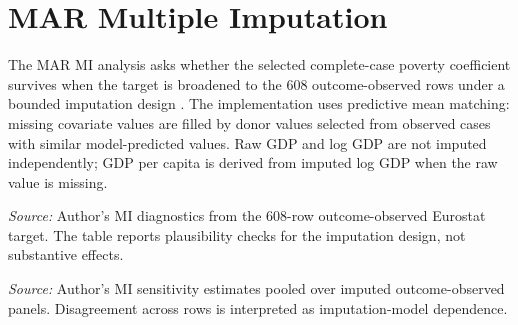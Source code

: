 \clearpage

\section{MAR Multiple Imputation}

The MAR MI analysis asks whether the selected complete-case poverty coefficient survives when the target is broadened to the 608 outcome-observed rows under a bounded imputation design \citep{rubin_1987,little_rubin_2019}. The implementation uses predictive mean matching: missing covariate values are filled by donor values selected from observed cases with similar model-predicted values. Raw GDP and log GDP are not imputed independently; GDP per capita is derived from imputed log GDP when the raw value is missing.

\begin{table}[htbp]
\centering
\scriptsize
\caption{Baseline PMM diagnostics for imputed covariates. Diagnostics refer to the 608-row outcome-observed target, the 30-imputation baseline PMM model, and bounded plausible ranges for imputed covariates.}
\label{tab:mi_diagnostics_summary}

\vspace{0.25em}

\begin{minipage}{0.96\textwidth}
\scriptsize \textit{Source:} Author's MI diagnostics from the 608-row outcome-observed Eurostat target. The table reports plausibility checks for the imputation design, not substantive effects.
\end{minipage}
\end{table}

\begin{table}[htbp]
\centering
\small
\caption{Multiple-imputation sensitivity variants. Rows compare PMM variants with outcome inclusion, no-outcome specification, country indicators, lagged predictors, and a 50-imputation check for the poverty coefficient in the outcome-observed target.}
\label{tab:mi_variant_summary}

\vspace{0.25em}

\begin{minipage}{0.92\textwidth}
\scriptsize \textit{Source:} Author's MI sensitivity estimates pooled over imputed outcome-observed panels. Disagreement across rows is interpreted as imputation-model dependence.
\end{minipage}
\end{table}

